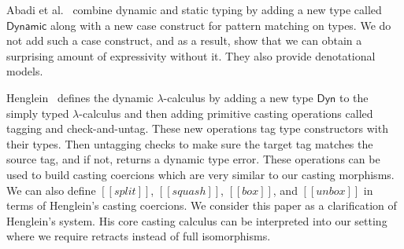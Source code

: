 Abadi et al.~\cite{Abadi:1989} combine dynamic and static typing
by adding a new type called $\mathsf{Dynamic}$ along with a new case
construct for pattern matching on types.  We do not add such a case
construct, and as a result, show that we can obtain a surprising
amount of expressivity without it.  They also provide denotational
models.

Henglein~\cite{Henglein:1994} defines the dynamic
$\lambda$-calculus by adding a new type $\mathsf{Dyn}$ to the simply
typed $\lambda$-calculus and then adding primitive casting
operations called tagging and check-and-untag.  These new operations
tag type constructors with their types.  Then untagging checks to
make sure the target tag matches the source tag, and if not, returns
a dynamic type error.  These operations can be used to build casting
coercions which are very similar to our casting morphisms. We can
also define $[[split]]$, $[[squash]]$, $[[box]]$, and $[[unbox]]$ in
terms of Henglein's casting coercions.  We consider this paper as a
clarification of Henglein's system.  His core casting calculus can
be interpreted into our setting where we require retracts instead of
full isomorphisms.
